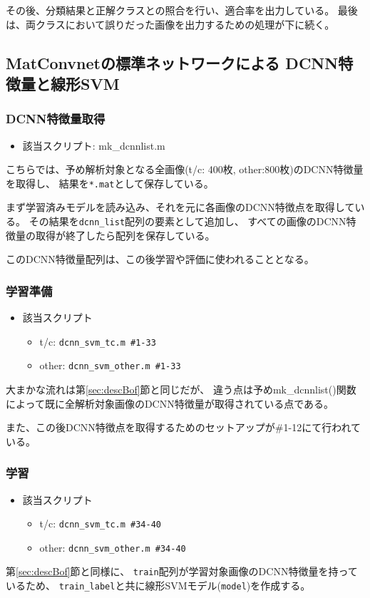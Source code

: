 \documentclass[11pt,a4paper, uplatex]{jsreport}
\begin{document}
その後、分類結果と正解クラスとの照合を行い、適合率を出力している。
最後は、両クラスにおいて誤りだった画像を出力するための処理が下に続く。
\subsection{MatConvnetの標準ネットワークによる DCNN特徴量と線形SVM}\label{sec:descDcnn}
\subsubsection{DCNN特徴量取得}
\begin{itemize}
  \item 該当スクリプト: mk_dcnnlist.m
\end{itemize}
こちらでは、予め解析対象となる全画像(t/c: 400枚, other:800枚)のDCNN特徴量を取得し、
結果を\texttt{*.mat}として保存している。

まず学習済みモデルを読み込み、それを元に各画像のDCNN特徴点を取得している。
その結果を\texttt{dcnn_list}配列の要素として追加し、
すべての画像のDCNN特徴量の取得が終了したら配列を保存している。

このDCNN特徴量配列は、この後学習や評価に使われることとなる。

\subsubsection{学習準備}
\begin{itemize}
  \item 該当スクリプト
  \begin{itemize}
    \item t/c: \texttt{dcnn_svm_tc.m \#1-33}
    \item other: \texttt{dcnn_svm_other.m \#1-33}
  \end{itemize}
\end{itemize}
大まかな流れは第\ref{sec:descBof}節と同じだが、
違う点は予めmk_dcnnlist()関数によって既に全解析対象画像のDCNN特徴量が取得されている点である。

また、この後DCNN特徴点を取得するためのセットアップが\#1-12にて行われている。
\subsubsection{学習}
\begin{itemize}
  \item 該当スクリプト
  \begin{itemize}
    \item t/c: \texttt{dcnn_svm_tc.m \#34-40}
    \item other: \texttt{dcnn_svm_other.m \#34-40}
  \end{itemize}
\end{itemize}
第\ref{sec:descBof}節と同様に、
\texttt{train}配列が学習対象画像のDCNN特徴量を持っているため、
\texttt{train_label}と共に線形SVMモデル(\texttt{model})を作成する。
\end{document}
